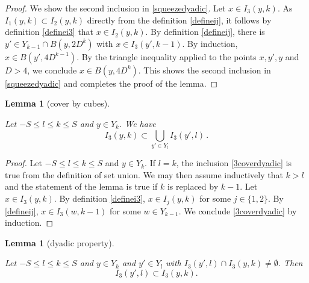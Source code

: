 \documentclass[10pt,a4paper]{article}
\theoremstyle{plain}
\newtheorem{lemma}[theorem]{Lemma}
\theoremstyle{definition}
\numberwithin{equation}{subsection}
\newcommand{\lean}[1]{}
\newcommand{\uses}[1]{}
\newcommand{\leanok}{}
\begin{document}
\begin{proof}
We show the second inclusion in \eqref{squeezedyadic}. Let $x\in I_3(y,k)$. As $I_1(y,k)\subset I_2(y,k)$ directly from the definition \eqref{defineij}, it follows by definition \eqref{definei3} that $x\in I_2(y,k)$. By definition \eqref{defineij}, there is $y'\in Y_{k-1}\cap B(y,2D^k)$ with $x\in I_3(y',k-1)$. By induction, $x\in B(y', 4D^{k-1})$. By the triangle inequality applied to the points $x,y',y$ and $D>4$, we conclude $x\in B(y,4D^k)$. This shows the second inclusion in \eqref{squeezedyadic} and completes the proof of the lemma.
\end{proof}

\begin{lemma}[cover by cubes]
    \label{cover-by-cubes}
    \leanok
    \lean{cover_by_cubes}
    Let $-S\le l\le k\le S$ and
    $y\in Y_k$.
    We have
    \begin{equation}\label{3coverdyadic}
    I_3(y,k)\subset \bigcup_{y'\in Y_l} I_3(y',l)\, .
    \end{equation}
\end{lemma}
\begin{proof}
    \leanok
    Let $-S\le l\le k\le S$ and $y\in Y_k$.
    If $l=k$, the inclusion \eqref{3coverdyadic}
    is true from the definition of set union.
    We may then assume inductively that $k>l$ and the statement of the lemma is true if $k$ is replaced by $k-1$.
    Let $x\in I_3(y,k)$.
    By definition \eqref{definei3}, $x\in I_j(y,k)$
    for some $j\in \{1,2\}$. By \eqref{defineij},
    $x\in I_3(w,k-1)$ for some $w\in Y_{k-1}$.
    We conclude \eqref{3coverdyadic} by induction.
\end{proof}

\begin{lemma}[dyadic property]
    \label{dyadic-property}
    \uses{basic-grid-structure, cover-by-cubes}
    \leanok
    \lean{dyadic_property}
    Let $-S\le l\le k\le S$ and $y\in Y_k$ and $y'\in Y_l$ with
    $I_3(y',l)\cap I_3(y,k)\neq \emptyset$. Then
    \begin{equation}
        \label{3dyadicproperty}
    I_3(y',l)\subset I_3(y,k).
    \end{equation}
\end{lemma}
\end{document}
